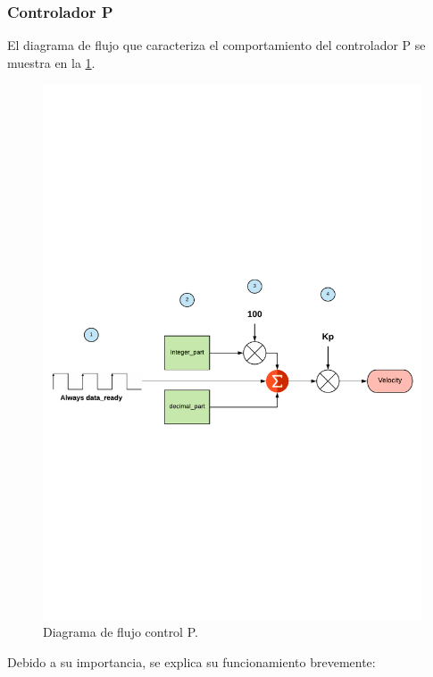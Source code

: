 \subsubsection{Controlador P} \label{sec:ControladorP}
El diagrama de flujo que caracteriza el comportamiento del controlador P se muestra en la \ref{fig:P_control}.
	\begin{figure}[H]
	\center
	\includegraphics[trim = 0cm 7cm 0mm 7cm, clip,scale=0.7]{imagenes/Balancing_robot/P.pdf}
	\caption{Diagrama de flujo control P.}
	\label{fig:P_control}
\end{figure}

Debido a su importancia, se explica su funcionamiento brevemente:

